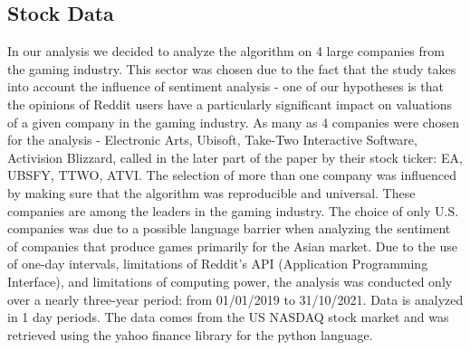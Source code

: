 \documentclass[11pt]{article} %
\begin{document}
\subsection{Stock Data}
In our analysis we decided to analyze the algorithm on 4 large companies from the gaming industry. This sector was chosen due to the fact that the study takes into account the influence of sentiment analysis - one of our hypotheses is that the opinions of Reddit users have a particularly significant impact on valuations of a given company in the gaming industry. As many as 4 companies were chosen for the analysis - Electronic Arts, Ubisoft, Take-Two Interactive Software, Activision Blizzard, called in the later part of the paper by their stock ticker: EA, UBSFY, TTWO, ATVI.  The selection of more than one company was influenced by making sure that the algorithm was reproducible and universal. These companies are among the leaders in the gaming industry. The choice of only U.S. companies was due to a possible language barrier when analyzing the sentiment of companies that produce games primarily for the Asian market. Due to the use of one-day intervals, limitations of Reddit's API (Application Programming Interface), and limitations of computing power, the analysis was conducted only over a nearly three-year period: from 01/01/2019 to 31/10/2021. Data is analyzed in 1 day periods. The data comes from the US NASDAQ stock market and was retrieved using the yahoo finance library for the python language. 
\end{document}
